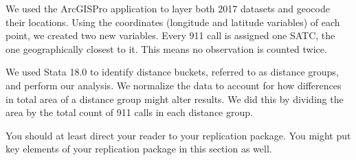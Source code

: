\documentclass[12pt]{article}
\begin{document}
We used the ArcGISPro application to layer both 2017 datasets and geocode their locations. Using the coordinates (longitude and latitude variables) of each point, we created two new variables. Every 911 call is assigned one SATC, the one geographically closest to it. This means no observation is counted twice. 

We used Stata 18.0 to identify distance buckets, referred to as distance groups, and perform our analysis. We normalize the data to account for how differences in total area of a distance group might alter results. We did this by dividing the area by the total count of 911 calls in each distance group. 

You should at least direct your reader to your replication package. You might put key elements of your replication package in this section as well.
\end{document}
